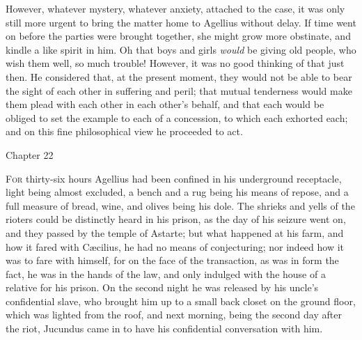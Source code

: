However, whatever mystery, whatever anxiety, attached to the case,
it was only still more urgent to bring the matter home to Agellius
without delay. If time went on before the parties were brought
together, she might grow more obstinate, and kindle a like spirit in
him. Oh that boys and girls \emph{would} be giving old people, who
wish them well, so much trouble! However, it was no good thinking of
that just then. He considered that, at the present moment, they would
not be able to bear the sight of each other in suffering and peril;
that mutual tenderness would make them plead with each other in each
other's behalf, and that each would be obliged to set the example to
each of a concession, to which each exhorted each; and on this fine
philosophical view he proceeded to act.

Chapter 22


F\textsc{or} thirty-six hours Agellius had been confined in his
underground receptacle, light being almost excluded, a bench and a rug
being his means of repose, and a full measure of bread, wine, and
olives being his dole. The shrieks and yells of the rioters could be
distinctly heard in his prison, as the day of his seizure went on, and
they passed by the temple of Astarte; but what happened at his farm,
and how it fared with Cæcilius, he had no means of conjecturing; nor
indeed how it was to fare with himself, for on the face of the
transaction, as was in form the fact, he was in the hands of the law,
and only indulged with the house of a relative for his prison. On the
second night he was released by his uncle's confidential slave, who
brought him up to a small back closet on the ground floor, which was
lighted from the roof, and next morning, being the second day after
the riot, Jucundus came in to have his confidential conversation with
him.

